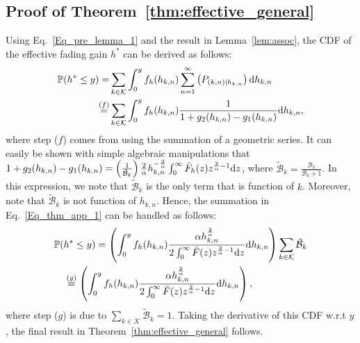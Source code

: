 \documentclass[final]{IEEEtran}
\begin{document}
\subsection{Proof of Theorem~\ref{thm:effective_general}}\label{app:effective}
Using Eq.~\ref{Eq_pre_lemma_1} and the result in Lemma~\ref{lem:assoc}, the CDF of the effective fading gain $h^*$ can be derived as follows:
\begin{align}
\label{Eq_thm_app_1}
\mathbb{P}(h^*\leq y) =&\sum_{k\in\mathcal{K}}\int_0^{y}f_h(h_{k,n})\sum_{n=1}^{\infty}\left(P_{(k,n)|h_{k,n}}\right){\rm d}h_{k,n}\\
\stackrel{(f)}{=}&\sum_{k\in\mathcal{K}}\int_0^{y}f_h(h_{k,n})\frac{1}{1+g_2(h_{k,n})-g_1(h_{k,n})}{\rm d}h_{k,n},\nonumber
\end{align}
where step ($f$) comes from using the summation of a geometric series. It can easily be shown with simple algebraic manipulations that ${1+g_2(h_{k,n})-g_1(h_{k,n})}=\left(\frac{1}{\tilde{\mathcal{B}}_k}\right)\frac{2}{\alpha}h_{k,n}^{-\frac{2}{\alpha}}\int_0^{\infty}\bar{F}_h(z)z^{\frac{2}{\alpha}-1}{\rm d}z$, where $\tilde{\mathcal{B}}_k=\frac{\mathcal{B}_k}{\mathcal{B}_k+1}$. In this expression, we note that $\tilde{\mathcal{B}}_k$ is the only term that is function of $k$. Moreover, note that $\tilde{\mathcal{B}}_k$ is not function of $h_{k,n}$. Hence, the summation in Eq.~\ref{Eq_thm_app_1} can be handled as follows:
\begin{align}
\label{Eq_thm_app_2}
\mathbb{P}(&h^*\leq y)=\left(\int_0^{y}f_h(h_{k,n})\frac{\alpha h_{k,n}^{\frac{2}{\alpha}}}{2\int_0^\infty\bar{F}(z)z^{\frac{2}{\alpha}-1}{\rm d}z}{\rm d}h_{k,n}\right)\sum_{k\in\mathcal{K}}\tilde{\mathcal{B}}_k\nonumber\\
&\stackrel{(g)}{=}\left(\int_0^{y}f_h(h_{k,n})\frac{\alpha h_{k,n}^{\frac{2}{\alpha}}}{2\int_0^\infty\bar{F}(z)z^{\frac{2}{\alpha}-1}{\rm d}z}{\rm d}h_{k,n}\right),
\end{align}   
where step ($g$) is due to $\sum_{k\in\mathcal{K}}\tilde{\mathcal{B}}_k=1$. Taking the derivative of this CDF w.r.t $y$, the final result in Theorem~\ref{thm:effective_general} follows. 
\vspace{-2mm}


\end{document}
